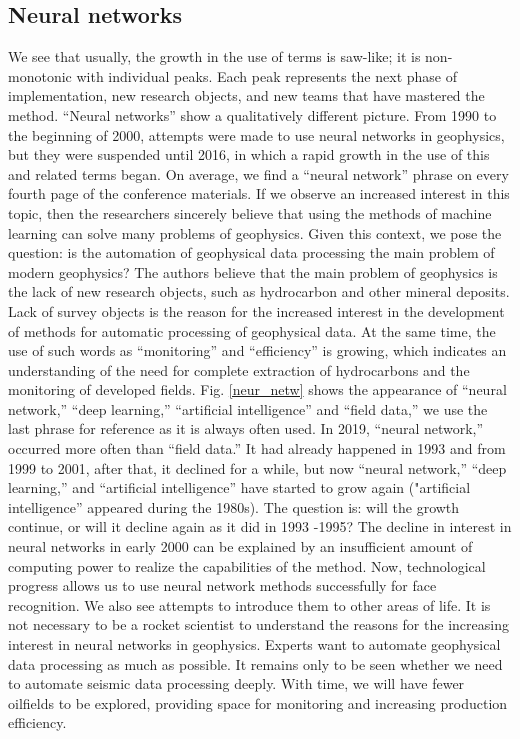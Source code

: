 \documentclass[geosciences,article,submit,moreauthors,pdftex]{Definitions/mdpi}
\begin{document}
\subsection{Neural networks} 
We see that usually, the growth in the use of terms is saw-like; it is non-monotonic with individual peaks. Each peak represents the next phase of implementation, new research objects, and new teams that have mastered the method. ``Neural networks'' show a qualitatively different picture. From 1990 to the beginning of 2000, attempts were made to use neural networks in geophysics, but they were suspended until 2016, in which a rapid growth in the use of this and related terms began. On average, we find a ``neural network'' phrase on every fourth page of the conference materials. If we observe an increased interest in this topic, then the researchers sincerely believe that using the methods of machine learning can solve many problems of geophysics. Given this context, we pose the question: is the automation of geophysical data processing the main problem of modern geophysics? The authors believe that the main problem of geophysics is the lack of new research objects, such as hydrocarbon and other mineral deposits. Lack of survey objects is the reason for the increased interest in the development of methods for automatic processing of geophysical data. At the same time, the use of such words as ``monitoring'' and ``efficiency'' is growing, which indicates an understanding of the need for complete extraction of hydrocarbons and the monitoring of developed fields. Fig. \ref{neur_netw} shows the appearance of ``neural network,'' ``deep learning,'' ``artificial intelligence'' and ``field data,'' we use the last phrase for reference as it is always often used. In 2019, ``neural network,'' occurred more often than ``field data.'' It had already happened in 1993 and from 1999 to 2001, after that, it declined for a while, but now ``neural network,'' ``deep learning,'' and ``artificial intelligence'' have started to grow again ("artificial intelligence'' appeared during the 1980s). The question is: will the growth continue, or will it decline again as it did in 1993 -1995? The decline in interest in neural networks in early 2000 can be explained by an insufficient amount of computing power to realize the capabilities of the method. Now, technological progress allows us to use neural network methods successfully for face recognition. We also see attempts to introduce them to other areas of life. It is not necessary to be a rocket scientist to understand the reasons for the increasing interest in neural networks in geophysics. Experts want to automate geophysical data processing as much as possible. It remains only to be seen whether we need to automate seismic data processing deeply. With time, we will have fewer oilfields to be explored, providing space for monitoring and increasing production efficiency. 
\end{document}

